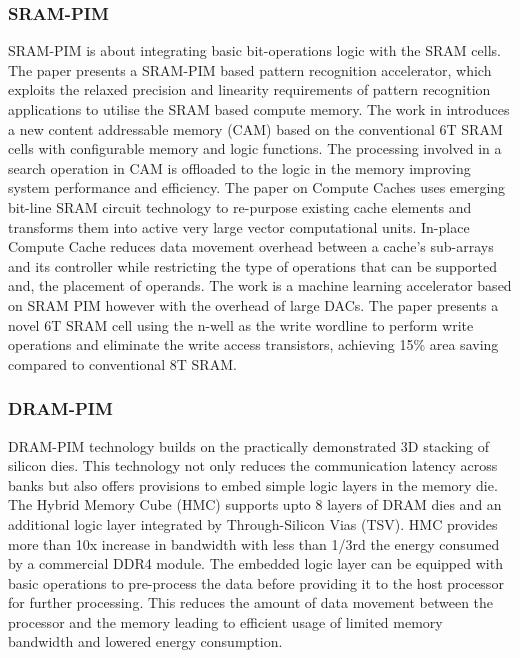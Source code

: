     \subsubsection{SRAM-PIM}
      SRAM-PIM is about integrating basic bit-operations logic with the SRAM cells. The paper \cite{prsram} presents a SRAM-PIM based pattern recognition accelerator, which exploits the relaxed precision and linearity requirements of pattern recognition applications to utilise the SRAM based compute memory. The work in \cite{cam} introduces a new content addressable memory (CAM) based on the conventional 6T SRAM cells with configurable memory and logic functions. The processing involved in a search operation in CAM is offloaded to the logic in the memory improving system performance and efficiency. The paper on Compute Caches \cite{computecache} uses emerging bit-line SRAM circuit technology to re-purpose existing cache elements and transforms them into active very large vector computational units. In-place Compute Cache reduces data movement overhead between a cache's sub-arrays and its controller while restricting the type of operations that can be supported and, the placement of operands. The work \cite{sramml} is a machine learning accelerator based on SRAM PIM however with the overhead of large DACs. The paper \cite{6Tsram} presents a novel 6T SRAM cell using the n-well as the write wordline to perform write operations and eliminate the write access transistors, achieving 15\% area saving compared to conventional 8T SRAM.

    \subsubsection{DRAM-PIM}
      DRAM-PIM technology builds on the practically demonstrated 3D stacking of silicon dies. This technology not only reduces the communication latency across banks but also offers provisions to embed simple logic layers in the memory die. The Hybrid Memory Cube (HMC) \cite{hmc, amc} supports upto 8 layers of DRAM dies and an additional logic layer integrated by Through-Silicon Vias (TSV). HMC provides more than 10x increase in bandwidth with less than 1/3rd the energy consumed by a commercial DDR4 module. The embedded logic layer can be equipped with basic operations to pre-process the data before providing it to the host processor for further processing. This reduces the amount of data movement between the processor and the memory leading to efficient usage of limited memory bandwidth and lowered energy consumption.
      
